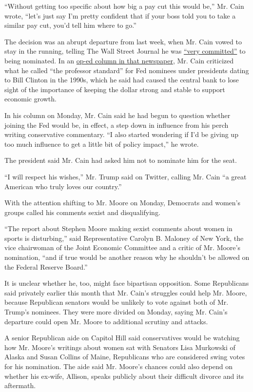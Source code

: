 ``Without getting too specific about how big a pay cut this would be,''
Mr. Cain wrote, ``let's just say I'm pretty confident that if your boss
told you to take a similar pay cut, you'd tell him where to go.''

The decision was an abrupt departure from last week, when Mr. Cain vowed
to stay in the running, telling The Wall Street Journal he was
\href{https://www.wsj.com/articles/herman-cain-says-he-wont-withdraw-from-consideration-for-fed-board-11555529563}{``very
committed''} to being nominated. In an
\href{https://www.wsj.com/articles/the-fed-and-the-professor-standard-11555541719}{op-ed
column in that newspaper}, Mr. Cain criticized what he called ``the
professor standard'' for Fed nominees under presidents dating to Bill
Clinton in the 1990s, which he said had caused the central bank to lose
sight of the importance of keeping the dollar strong and stable to
support economic growth.

In his column on Monday, Mr. Cain said he had begun to question whether
joining the Fed would be, in effect, a step down in influence from his
perch writing conservative commentary. ``I also started wondering if I'd
be giving up too much influence to get a little bit of policy impact,''
he wrote.

The president said Mr. Cain had asked him not to nominate him for the
seat.

``I will respect his wishes,'' Mr. Trump said on Twitter, calling Mr.
Cain ``a great American who truly loves our country.''

With the attention shifting to Mr. Moore on Monday, Democrats and
women's groups called his comments sexist and disqualifying.

``The report about Stephen Moore making sexist comments about women in
sports is disturbing,'' said Representative Carolyn B. Maloney of New
York, the vice chairwoman of the Joint Economic Committee and a critic
of Mr. Moore's nomination, ``and if true would be another reason why he
shouldn't be allowed on the Federal Reserve Board.''

It is unclear whether he, too, might face bipartisan opposition. Some
Republicans said privately earlier this month that Mr. Cain's struggles
could help Mr. Moore, because Republican senators would be unlikely to
vote against both of Mr. Trump's nominees. They were more divided on
Monday, saying Mr. Cain's departure could open Mr. Moore to additional
scrutiny and attacks.

A senior Republican aide on Capitol Hill said conservatives would be
watching how Mr. Moore's writings about women sat with Senators Lisa
Murkowski of Alaska and Susan Collins of Maine, Republicans who are
considered swing votes for his nomination. The aide said Mr. Moore's
chances could also depend on whether his ex-wife, Allison, speaks
publicly about their difficult divorce and its aftermath.

